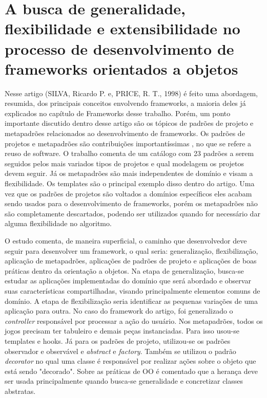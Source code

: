 \documentclass[
    12pt,       %
    openright,      %
    twoside,      %
    a4paper,      %
    english,      %
    french,       %
    spanish,      %
    brazil,       %
    ]{abntex2}
\begin{document}
    \section{A busca de generalidade, flexibilidade e extensibilidade no processo de desenvolvimento de frameworks orientados a objetos}
    Nesse artigo (SILVA, Ricardo P. e, PRICE, R. T., 1998) é feito uma abordagem, resumida, dos principais conceitos envolvendo frameworks, a
    maioria deles já explicados no capítulo de Frameworks desse trabalho. Porém, um ponto importante
    discutido dentro desse artigo são os tópicos de padrões de projeto e metapadrões relacionados
    ao desenvolvimento de frameworks. Os padrões de projetos e metapadrões são contribuições
    importantíssimas , no que se refere a reuso de software. O trabalho comenta de um catálogo com
    23 padrões a serem seguidos pelos mais variados tipos de projetos e qual modelagem os projetos devem
    seguir. Já os metapadrões são mais independentes de domínio e visam a flexibilidade. Os templates são o
    principal exemplo disso dentro do artigo. Uma vez que os padrões de projetos são voltados a domínios
    específicos eles acabam sendo usados para o desenvolvimento de frameworks, porém os metapadrões não são
    completamente descartados, podendo ser utilizados quando for necessário dar alguma flexibilidade no
    algoritmo.

    O estudo comenta, de maneira superficial, o caminho que desenvolvedor deve seguir para desenvolver um
    framework, o qual seria: generalização, flexibilização, aplicação de metapadrões, aplicações de padrões
    de projeto e aplicações de boas práticas dentro da orientação a objetos.
    Na etapa de generalização, busca-se estudar as aplicações implementadas do domínio que será abordado
    e observar suas características compartilhadas, visando principalmente elementos comuns de domínio. A
    etapa de flexibilização seria identificar as pequenas variações de uma aplicação para outra. No caso do
    framework do artigo, foi generalizado o \textit{controller} responsável por processar a ação do usuário.
    Nos metapadrões, todos os jogos precisam ter tabuleiro e demais peças instanciadas. Para isso usou-se
    templates e hooks. Já para os padrões de projeto, utilizou-se os padrões observador e observável e
    \textit{abstract} e \textit{factory}. Também se utilizou o padrão \textit{decorator} no qual uma
    classe é responsável por realizar ações sobre o objeto que está sendo "decorado". Sobre as práticas
    de OO é comentado que a herança deve ser usada principalmente quando busca-se generalidade e concretizar classes abstratas.
\end{document}
